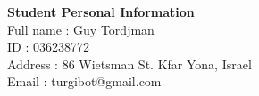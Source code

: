 \noindent\textbf{Student Personal Information}\\[0.3cm]
Full name : Guy Tordjman\\
ID : 036238772\\
Address : 86 Wietsman St. Kfar Yona, Israel\\
Email : turgibot@gmail.com\\[0.5cm]

